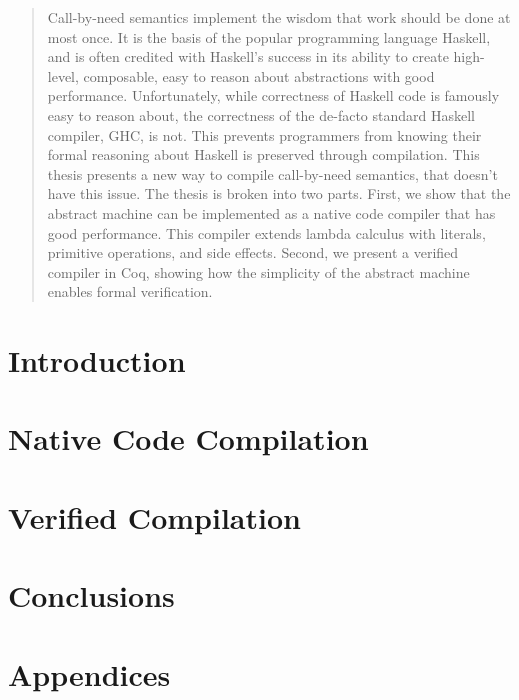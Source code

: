 \documentclass[botnum, fleqn]{unmeethesis}
\begin{document}
\begin{abstract}
Call-by-need semantics implement the wisdom that work should be done at most
once. It is the basis of the popular programming language Haskell, and is often
credited with Haskell's success in its ability to create high-level, composable,
easy to reason about abstractions with good performance. Unfortunately, while
correctness of Haskell code is famously easy to reason about, the correctness of
the de-facto standard Haskell compiler, GHC, is not. This prevents programmers
from knowing their formal reasoning about Haskell is preserved through
compilation. This thesis presents a new way to compile call-by-need semantics,
that doesn't have this issue. The thesis is broken into two parts. First, we
show that the abstract machine can be implemented as a native code compiler that
has good performance. This compiler extends lambda calculus with literals,
primitive operations, and side effects. Second, we present a verified compiler
in Coq, showing how the simplicity of the abstract machine enables formal
verification. 
\clearpage %
\end{abstract}

\tableofcontents
\listoffigures

\mainmatter

\chapter{Introduction}


\chapter{Native Code Compilation}\label{chap:cem}











\chapter{Verified Compilation}










\chapter{Conclusions}


\chapter*{Appendices}

\appendix





\end{document}
